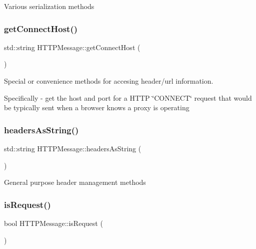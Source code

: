 Various serialization methods \mbox{\label{class_h_t_t_p_message_aae482763d5174a29c53d4dc65f7ed6c9}} 
\subsubsection{\texorpdfstring{get\+Connect\+Host()}{getConnectHost()}}
{\footnotesize\ttfamily std\+::string H\+T\+T\+P\+Message\+::get\+Connect\+Host (\begin{DoxyParamCaption}{ }\end{DoxyParamCaption})}

Special or convenience methods for accesing header/url information.

Specifically -\/ get the host and port for a H\+T\+TP \char`\"{}\+C\+O\+N\+N\+E\+C\+T\char`\"{} request that would be typically sent when a browser knows a proxy is operating \mbox{\label{class_h_t_t_p_message_ae34ca512eaaa6ab18b65dd558ec0e860}} 
\subsubsection{\texorpdfstring{headers\+As\+String()}{headersAsString()}}
{\footnotesize\ttfamily std\+::string H\+T\+T\+P\+Message\+::headers\+As\+String (\begin{DoxyParamCaption}{ }\end{DoxyParamCaption})}

General purpose header management methods \mbox{\label{class_h_t_t_p_message_a245bb3c5c6a546ff3229ff293b2e509c}} 
\subsubsection{\texorpdfstring{is\+Request()}{isRequest()}}
{\footnotesize\ttfamily bool H\+T\+T\+P\+Message\+::is\+Request (\begin{DoxyParamCaption}{ }\end{DoxyParamCaption})}

